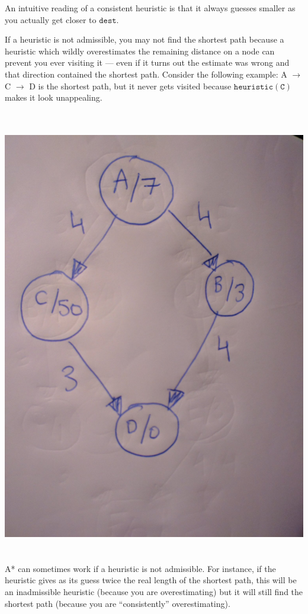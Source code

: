 \documentclass[a4paper,12pt]{article}
\newcommand{\kwa}[1]{\mathtt{#1}}
\begin{document}
\noindent
An intuitive reading of a consistent heuristic is that it always guesses smaller as you actually get closer to $\kwa{dest}$.

If a heuristic is not admissible, you may not find the shortest path because a heuristic which wildly overestimates the remaining distance on a node can prevent you ever visiting it --- even if it turns out the estimate was wrong and that direction contained the shortest path. Consider the following example: A $\rightarrow$ C $\rightarrow$ D is the shortest path, but it never gets visited because $\kwa{heuristic(C)}$ makes it look unappealing.

~\\~\\
\includegraphics[scale=0.1]{fig_inadmissible}
~\\~\\

\noindent
A* can sometimes work if a heuristic is not admissible. For instance, if the heuristic gives as its guess twice the real length of the shortest path, this will be an inadmissible heuristic (because you are overestimating) but it will still find the shortest path (because you are ``consistently'' overestimating).
\end{document}
